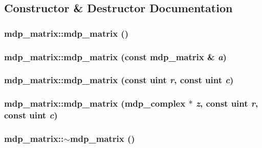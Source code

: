 \subsection{Constructor \& Destructor Documentation}
\hypertarget{classmdp__matrix_a54b72b2aaf4630fce237604942cf6b3d}{
\subsubsection[{mdp\_\-matrix}]{\setlength{\rightskip}{0pt plus 5cm}mdp\_\-matrix::mdp\_\-matrix ()}}
\label{classmdp__matrix_a54b72b2aaf4630fce237604942cf6b3d}
\hypertarget{classmdp__matrix_a8f70e8e0ad282c3f9c83ff0550eda677}{
\subsubsection[{mdp\_\-matrix}]{\setlength{\rightskip}{0pt plus 5cm}mdp\_\-matrix::mdp\_\-matrix (const {\bf mdp\_\-matrix} \& {\em a})}}
\label{classmdp__matrix_a8f70e8e0ad282c3f9c83ff0550eda677}
\hypertarget{classmdp__matrix_a943b6d355ac862b8592648275ba1639f}{
\subsubsection[{mdp\_\-matrix}]{\setlength{\rightskip}{0pt plus 5cm}mdp\_\-matrix::mdp\_\-matrix (const {\bf uint} {\em r}, \/  const {\bf uint} {\em c})}}
\label{classmdp__matrix_a943b6d355ac862b8592648275ba1639f}
\hypertarget{classmdp__matrix_a743bde7a120b947e065c8fd7b658b163}{
\subsubsection[{mdp\_\-matrix}]{\setlength{\rightskip}{0pt plus 5cm}mdp\_\-matrix::mdp\_\-matrix ({\bf mdp\_\-complex} $\ast$ {\em z}, \/  const {\bf uint} {\em r}, \/  const {\bf uint} {\em c})}}
\label{classmdp__matrix_a743bde7a120b947e065c8fd7b658b163}
\hypertarget{classmdp__matrix_a5c20b7431f6da6f54c381331f8a09c44}{
\subsubsection[{$\sim$mdp\_\-matrix}]{\setlength{\rightskip}{0pt plus 5cm}mdp\_\-matrix::$\sim$mdp\_\-matrix ()}}
\label{classmdp__matrix_a5c20b7431f6da6f54c381331f8a09c44}


